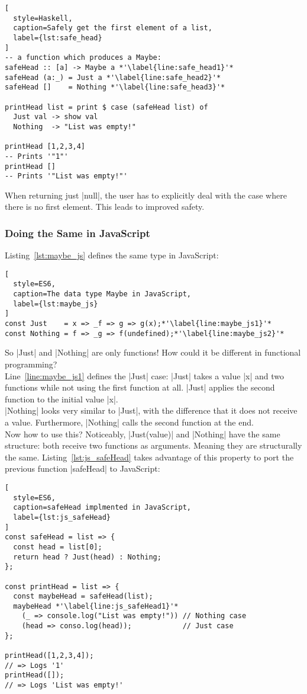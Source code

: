 \begin{lstlisting}[
  style=Haskell,
  caption=Safely get the first element of a list,
  label={lst:safe_head}
]
-- a function which produces a Maybe:
safeHead :: [a] -> Maybe a *'\label{line:safe_head1}'*
safeHead (a:_) = Just a *'\label{line:safe_head2}'*
safeHead []    = Nothing *'\label{line:safe_head3}'*

printHead list = print $ case (safeHead list) of 
  Just val -> show val
  Nothing  -> "List was empty!"

printHead [1,2,3,4]
-- Prints '"1"'
printHead []
-- Prints '"List was empty!"'
\end{lstlisting}

When returning just |null|, the user has to explicitly deal with the case where
there is no first element. This leads to improved safety.

\subsubsection{Doing the Same in JavaScript} %
\label{subsub:Doing the same in JavaScript}
Listing~\ref{lst:maybe_js} defines the same type in JavaScript:
\begin{lstlisting}[
  style=ES6,
  caption=The data type Maybe in JavaScript,
  label={lst:maybe_js}
]
const Just    = x => _f => g => g(x);*'\label{line:maybe_js1}'*
const Nothing = f => _g => f(undefined);*'\label{line:maybe_js2}'*
\end{lstlisting}

So |Just| and |Nothing| are only functions! How could it be different in
functional programming? \\ 
Line~\ref{line:maybe_js1} defines the |Just| case:
|Just| takes a value |x| and two functions while not using the first function
at all. |Just| applies the second function to the initial value |x|. \\ 
|Nothing| looks very similar to |Just|, with the difference that it does not
receive a value. Furthermore, |Nothing| calls the second function at the end.\\ 
Now how to use this? Noticeably, |Just(value)| and |Nothing| have the same
structure: both receive two functions as arguments. Meaning they are
structurally the same. Listing~\ref{lst:js_safeHead} takes advantage of this
property to port the previous function |safeHead| to JavaScript:

\begin{lstlisting}[
  style=ES6,
  caption=safeHead implmented in JavaScript,
  label={lst:js_safeHead}
]
const safeHead = list => {
  const head = list[0];
  return head ? Just(head) : Nothing;
};

const printHead = list => {
  const maybeHead = safeHead(list);
  maybeHead *'\label{line:js_safeHead1}'*
    (_ => console.log("List was empty!")) // Nothing case
    (head => conso.log(head));            // Just case
};

printHead([1,2,3,4]);
// => Logs '1'
printHead([]);
// => Logs 'List was empty!'
\end{lstlisting}

